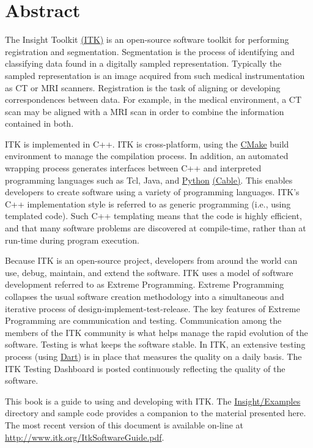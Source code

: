 \chapter*{Abstract}
\noindent
The Insight Toolkit \href{http://www.itk.org}{(ITK)} is an open-source software
toolkit for performing registration and segmentation. Segmentation is the
process of identifying and classifying data found in a digitally sampled
representation. Typically the sampled representation is an image acquired from
such medical instrumentation as CT or MRI scanners. Registration is the task of
aligning or developing correspondences between data. For example, in the
medical environment, a CT scan may be aligned with a MRI scan in order to
combine the information contained in both.

ITK is implemented in C++. ITK is cross-platform, using the 
\href{http://www.cmake.org}{CMake} 
build environment to manage the compilation process. In addition, an automated
wrapping process generates interfaces between C++ and interpreted programming
languages such as Tcl, Java, and \href{http://www.python.org}{Python}
\href{http://public.kitware.com/Cable/HTML/Index.html}{(Cable)}. This enables
developers to create software using a variety of programming languages. ITK's
C++ implementation style is referred to as generic programming (i.e., using
templated code). Such C++ templating means that the code is highly efficient, 
and that many software problems are discovered at compile-time, rather than at 
run-time during program execution.

Because ITK is an open-source project, developers from around the world can
use, debug, maintain, and extend the software. ITK uses a model of software
development referred to as Extreme Programming. Extreme Programming collapses
the usual software creation methodology into a simultaneous and iterative
process of design-implement-test-release. The key features of Extreme
Programming are communication and testing. Communication among the members of
the ITK community is what helps manage the rapid evolution of the software.
Testing is what keeps the software stable. In ITK, an extensive testing process
(using 
\href{http://public.kitware.com/dashboard.php}{Dart}) is in place that 
measures the quality on a daily basis. The ITK
Testing Dashboard is posted continuously reflecting the quality of the
software.

This book is a guide to using and developing with ITK. The
\href{http://www.itk.org/cgi-bin/cvsweb.cgi/Insight/Examples/?cvsroot=Insight}{Insight/Examples}
directory and sample code provides a companion to the material presented here.
The most recent version of this document is available on-line at
\url{http://www.itk.org/ItkSoftwareGuide.pdf}.



